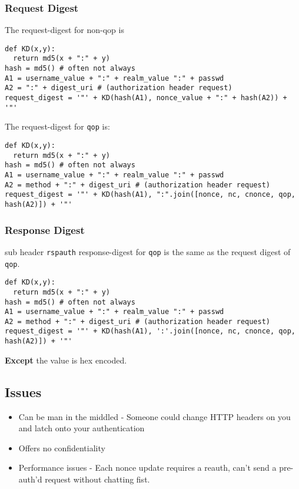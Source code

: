 \documentclass[../CMPUT-404-Notes.tex]{subfiles}
\begin{document}
\subsubsection{Request Digest}
The request-digest for non-qop is 
\begin{listing}[!h]
\begin{verbatim}
def KD(x,y):
  return md5(x + ":" + y)
hash = md5() # often not always
A1 = username_value + ":" + realm_value ":" + passwd
A2 = ":" + digest_uri # (authorization header request)
request_digest = '"' + KD(hash(A1), nonce_value + ":" + hash(A2)) + '"'
\end{verbatim}
\end{listing}

\newpage 
The request-digest for \texttt{qop} is:
\begin{listing}[!h]
\begin{verbatim}
def KD(x,y):
  return md5(x + ":" + y)
hash = md5() # often not always
A1 = username_value + ":" + realm_value ":" + passwd
A2 = method + ":" + digest_uri # (authorization header request)
request_digest = '"' + KD(hash(A1), ":".join([nonce, nc, cnonce, qop, hash(A2)]) + '"'
\end{verbatim}
\end{listing}

\subsubsection{Response Digest}
sub header \texttt{rspauth} 
response-digest for \texttt{qop} is the same as the request digest of \texttt{qop}.
\begin{listing}[!h]
\begin{verbatim}
def KD(x,y):
  return md5(x + ":" + y)
hash = md5() # often not always
A1 = username_value + ":" + realm_value ":" + passwd
A2 = method + ":" + digest_uri # (authorization header request)
request_digest = '"' + KD(hash(A1), ':'.join([nonce, nc, cnonce, qop, hash(A2)]) + '"'
\end{verbatim}
\end{listing}

\textbf{Except} the value is hex encoded.

\subsection{Issues}
\begin{itemize}
  \item Can be man in the middled - Someone could change HTTP headers on you and latch onto your authentication
  \item Offers no confidentiality
  \item Performance issues - Each nonce update requires a reauth, can't send a pre-auth'd request without chatting fist.
\end{itemize}
\end{document}
